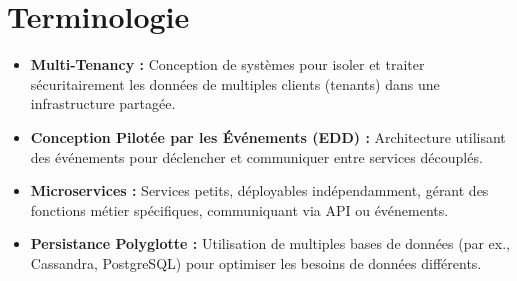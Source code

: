 \documentclass[11pt]{article}
\begin{document}
\section{Terminologie}
\begin{itemize}
    \item \textbf{Multi-Tenancy :} Conception de systèmes pour isoler et traiter sécuritairement les données de multiples clients (tenants) dans une infrastructure partagée.
    \item \textbf{Conception Pilotée par les Événements (EDD) :} Architecture utilisant des événements pour déclencher et communiquer entre services découplés.
    \item \textbf{Microservices :} Services petits, déployables indépendamment, gérant des fonctions métier spécifiques, communiquant via API ou événements.
    \item \textbf{Persistance Polyglotte :} Utilisation de multiples bases de données (par ex., Cassandra, PostgreSQL) pour optimiser les besoins de données différents.
\end{itemize}
\end{document}
